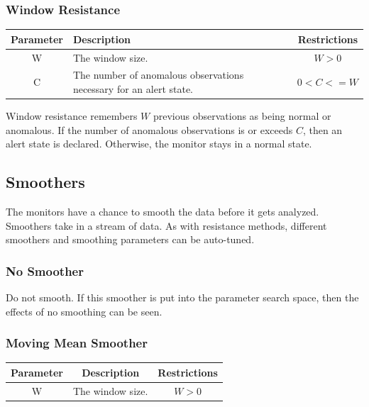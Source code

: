 \documentclass[12pt]{ucthesis}
\begin{document}
\subsubsection{Window Resistance}
\begin{table}[H]
   \begin{center}
      \begin{tabular}{|c|p{9cm}|c|}
         \hline
            Parameter & Description & Restrictions \\
         \hline
            W & The window size. & $ W > 0 $ \\
         \hline
            C & The number of anomalous observations necessary for an alert state. & $ 0 < C <= W $ \\
         \hline
      \end{tabular}
   \end{center}
\end{table}

Window resistance remembers $W$  previous observations as being normal or anomalous. If the number of anomalous
observations is or exceeds $C$, then an alert state is declared. Otherwise, the monitor stays in a normal state.

\subsection{Smoothers}
\label{arch-smoothers}
The monitors have a chance to smooth the data before it gets analyzed.
Smoothers take in a stream of data.
As with resistance methods, different smoothers and smoothing parameters can be auto-tuned.

\subsubsection{No Smoother}
Do not smooth. If this smoother is put into the parameter search space, then the effects of no smoothing can be seen.

\subsubsection{Moving Mean Smoother}
\begin{table}[H]
   \begin{center}
      \begin{tabular}{|c|c|c|}
         \hline
            Parameter & Description & Restrictions \\
         \hline
            W & The window size. & $ W > 0 $ \\
         \hline
      \end{tabular}
   \end{center}
\end{table}
\end{document}
